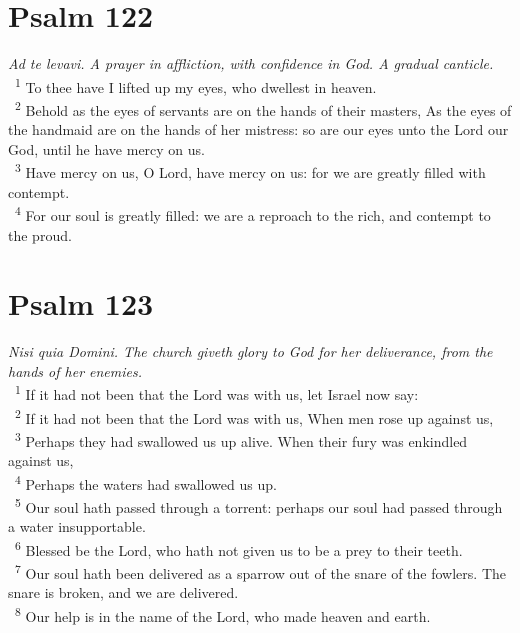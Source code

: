 \documentclass[a5paper,12pt]{article}
\begin{document}
\begin{multicols*}{2}
\section{Psalm 122}
\label{sec:org67485aa}
\emph{Ad te levavi. A prayer in affliction, with confidence in God. A gradual canticle.}\\

~\textsuperscript{1} To thee have I lifted up my eyes, who dwellest in heaven.\\
~\textsuperscript{2} Behold as the eyes of servants are on the hands of their masters, As the eyes of the handmaid are on the hands of her mistress: so are our eyes unto the Lord our God, until he have mercy on us.\\
~\textsuperscript{3} Have mercy on us, O Lord, have mercy on us: for we are greatly filled with contempt.\\
~\textsuperscript{4} For our soul is greatly filled: we are a reproach to the rich, and contempt to the proud.\\

\section{Psalm 123}
\label{sec:orga3b7aa3}
\emph{Nisi quia Domini. The church giveth glory to God for her deliverance, from the hands of her enemies.}\\

~\textsuperscript{1} If it had not been that the Lord was with us, let Israel now say:\\
~\textsuperscript{2} If it had not been that the Lord was with us, When men rose up against us,\\
~\textsuperscript{3} Perhaps they had swallowed us up alive. When their fury was enkindled against us,\\
~\textsuperscript{4} Perhaps the waters had swallowed us up.\\
~\textsuperscript{5} Our soul hath passed through a torrent: perhaps our soul had passed through a water insupportable.\\
~\textsuperscript{6} Blessed be the Lord, who hath not given us to be a prey to their teeth.\\
~\textsuperscript{7} Our soul hath been delivered as a sparrow out of the snare of the fowlers. The snare is broken, and we are delivered.\\
~\textsuperscript{8} Our help is in the name of the Lord, who made heaven and earth.\\


\end{multicols*}
\end{document}
